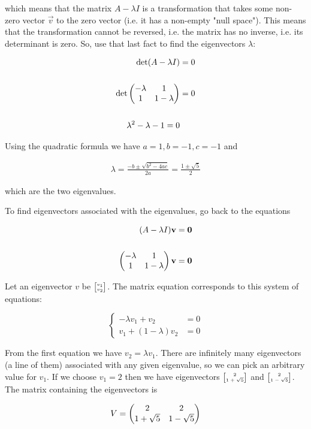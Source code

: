 which means that the matrix $A - \lambda I$ is a transformation that takes some
non-zero vector $\vec v$ to the zero vector (i.e. it has a non-empty "null
space"). This means that the transformation cannot be reversed, i.e. the matrix
has no inverse, i.e. its determinant is zero. So, use that last fact to find
the eigenvectors $\lambda$:

\begin{align*}
\det (A - \lambda I) &= 0
\\
\\
\det \begin{pmatrix}-\lambda & 1\\1           & 1 - \lambda\\ \end{pmatrix} &= 0
\\
\\
\lambda^2 - \lambda - 1 = 0
\end{align*}

Using the quadratic formula we have $a=1, b=-1, c=-1$ and

\begin{align*}
\lambda
= \frac{-b ± \sqrt{b^2 - 4ac}}{2a}
= \frac{1 ± \sqrt{5}}{2}
\end{align*}

which are the two eigenvalues.

To find eigenvectors associated with the eigenvalues, go back to the equations

\begin{align*}
(A - \lambda I)\mathbf v &= \mathbf 0
\\
\\
\begin{pmatrix}-\lambda & 1\\1        & 1 - \lambda\\ \end{pmatrix} \mathbf v &= \mathbf 0
\end{align*}

Let an eigenvector $v$ be $\tiny{\begin{bmatrix}v_1\\v_2\end{bmatrix}}$. The matrix equation corresponds
to this system of equations:

$$
\begin{cases}
-\lambda v_1 + v_2               &= 0\\
v_1          + (1 - \lambda) v_2 &= 0
\end{cases}
$$

From the first equation we have $v_2 = \lambda v_1$. There are infinitely many
eigenvectors (a line of them) associated with any given eigenvalue, so we can
pick an arbitrary value for $v_1$. If we choose $v_1=2$ then we have
eigenvectors $\tiny{\begin{bmatrix}2\\1+\sqrt 5\end{bmatrix}}$ and $\tiny{\begin{bmatrix}2\\1-\sqrt 5\end{bmatrix}}$. The matrix
containing the eigenvectors is

$$
V = \begin{pmatrix}2           & 2          \\1 + \sqrt 5 & 1 - \sqrt 5\\ \end{pmatrix}
$$


